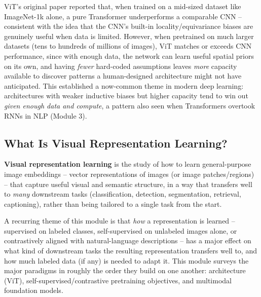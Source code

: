 \documentclass[12pt,a4paper]{article}
\begin{document}
\begin{keyidea}
ViT's original paper reported that, when trained on a mid-sized dataset like ImageNet-1k alone, a pure Transformer underperforms a comparable CNN -- consistent with the idea that the CNN's built-in locality/equivariance biases are genuinely useful when data is limited. However, when pretrained on much larger datasets (tens to hundreds of millions of images), ViT matches or exceeds CNN performance, since with enough data, the network can learn useful spatial priors on its own, and having \emph{fewer} hard-coded assumptions leaves \emph{more} capacity available to discover patterns a human-designed architecture might not have anticipated. This established a now-common theme in modern deep learning: architectures with weaker inductive biases but higher capacity tend to win out \emph{given enough data and compute}, a pattern also seen when Transformers overtook RNNs in NLP (Module 3).
\end{keyidea}

\subsection{What Is Visual Representation Learning?}

\begin{defbox}
\textbf{Visual representation learning} is the study of how to learn general-purpose image embeddings -- vector representations of images (or image patches/regions) -- that capture useful visual and semantic structure, in a way that transfers well to \emph{many} downstream tasks (classification, detection, segmentation, retrieval, captioning), rather than being tailored to a single task from the start.
\end{defbox}

\begin{keyidea}
A recurring theme of this module is that \emph{how} a representation is learned -- supervised on labeled classes, self-supervised on unlabeled images alone, or contrastively aligned with natural-language descriptions -- has a major effect on what kind of downstream tasks the resulting representation transfers well to, and how much labeled data (if any) is needed to adapt it. This module surveys the major paradigms in roughly the order they build on one another: architecture (ViT), self-supervised/contrastive pretraining objectives, and multimodal foundation models.
\end{keyidea}

\newpage
\end{document}
